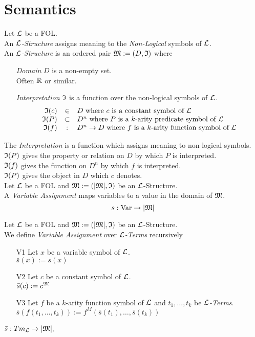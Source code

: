 \documentclass[11pt,a4paper]{article}
\begin{document}
\section{Semantics}

Let $\mathcal{L}$ be a FOL.\\
An \textit{$\mathcal{L}$-Structure} assigns meaning to the \textit{Non-Logical} symbols of $\mathcal{L}$.\\
An \textit{$\mathcal{L}$-Structure} is an ordered pair $\mathfrak{M}:=(D,\mathfrak{I})$ where
\begin{itemize}
	\item[\textit{Domain}] $D$ is a non-empty set.\\
	Often $\mathbb{R}$ or similar.
	\item[\textit{Interpretation}] $\mathfrak{I}$ is a function over the non-logical symbols of $\mathcal{L}$.
	\[\begin{array}{rcl}
	\mathfrak{I}(c)&\in&D\text{ where }c\text{ is a constant symbol of }\mathcal{L}\\
	\mathfrak{I}(P)&\subset&D^n\text{ where }P\text{ is a }k\text{-arity predicate symbol of }\mathcal{L}\\
	\mathfrak{I}(f)&:&D^n\to D\text{ where }f\text{ is a }k\text{-arity function symbol of }\mathcal{L}
	\end{array}\]
\end{itemize}

The \textit{Interpretation} is a function which assigns meaning to non-logical symbols.\\
$\mathfrak{I}(P)$ gives the property or relation on $D$ by which $P$ is interpreted.\\
$\mathfrak{I}(f)$ gives the function on $D^n$ by which $f$ is interpreted.\\
$\mathfrak{I}(P)$ gives the object in $D$ which $c$ denotes.\\

Let $\mathcal{L}$ be a FOL and $\mathfrak{M}:=(|\mathfrak{M}|,\mathfrak{I})$ be an $\mathcal{L}$-Structure.\\
A \textit{Variable Assignment} maps variables to a value in the domain of $\mathfrak{M}$.
$$s:\mathrm{Var}\to|\mathfrak{M}|$$

Let $\mathcal{L}$ be a FOL and $\mathfrak{M}:=(|\mathfrak{M}|,\mathfrak{I})$ be an $\mathcal{L}$-Structure.\\
We define \textit{Variable Assignment} over \textit{$\mathcal{L}$-Terms} recursively
\begin{itemize}
	\item[V1] Let $x$ be a variable symbol of $\mathcal{L}$.\\
	$\bar{s}(x):=s(x)$
	\item[V2] Let $c$ be a constant symbol of $\mathcal{L}$.\\
	$\bar{s}(c):=c^{\mathfrak{M}}$
	\item[V3] Let $f$ be a $k$-arity function symbol of $\mathcal{L}$ and $t_1,\dots,t_k$ be \textit{$\mathcal{L}$-Terms}.\\
	$\bar{s}(f(t_1,\dots,t_k)):=f^M(\bar{s}(t_1),\dots,\bar{s}(t_k))$
\end{itemize}
\nb $\bar{s}:Tm_{\mathcal{L}}\to|\mathfrak{M}|$.\\
\end{document}
